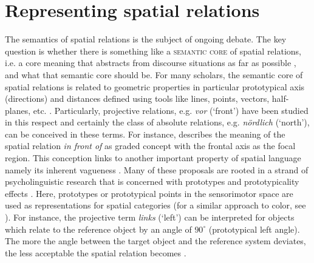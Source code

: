 \section{Representing spatial relations}
The semantics of spatial relations is the subject of ongoing debate. The 
key question is whether there is something like a 
\textsc{semantic core}  of 
spatial relations, i.e. a core meaning that 
abstracts from discourse situations as far as possible 
\citep{tenbrink2007space}, and what that 
semantic core should be. For many scholars, the semantic core of spatial 
relations is related to geometric 
properties \citep{herskovits1986language,eschenbach1999geometric,tenbrink2007space}
in particular prototypical axis (directions) and distances defined using tools 
like lines, points, vectors, half-planes, etc. \citep{levinson1996language}. 
Particularly, projective relations, e.g. \textit{vor} (`front') have been studied 
in this respect and certainly the class of absolute relations, e.g. \textit{n\"ordlich} 
(`north'), can be conceived in these terms. For instance, 
\cite{herskovits1986language}  describes the meaning 
of the spatial relation \textit{in front of} as graded concept with the frontal 
axis as the focal region. This conception links to another important property
of spatial language namely its inherent vagueness 
\citep{hall2008quantifying}.
Many of these proposals are rooted in a strand of psycholinguistic research that is concerned with
prototypes and prototypicality effects \citep{rosch1978principle}. 
Here, prototypes or prototypical points in the sensorimotor
space are used as representations for spatial categories
(for a similar approach to color, see \citealt{bleys2010phd}). 
For instance, the projective term \textit{links} (`left') can 
be interpreted for objects which relate to the reference object
by an angle of $90^\circ$ (prototypical left angle). The more the angle 
between the target object and the reference system deviates,
the less acceptable the spatial relation becomes \citep{tenbrink2005identifying,herskovits1986language,gapp1995angle}. 

